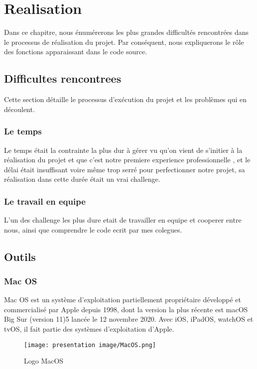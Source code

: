 \chapter{Realisation }
Dans ce chapitre, nous énumérerons les plus grandes difficultés rencontrées dans le processus de réalisation du projet. Par conséquent, nous expliquerons le rôle des fonctions apparaissant dans le code source.


\section{Difficultes rencontrees}


Cette section détaille le processus d'exécution du projet et les problèmes qui en découlent.
\subsection{Le temps}
Le temps était la contrainte la plus dur à gérer vu qu'on vient de s'initier à la réalisation du projet et que c'est notre premiere experience professionnelle , et le délai était insuffisant voire même trop serré pour perfectionner notre projet, sa réalisation dans cette durée était un vrai challenge.


\subsection{Le travail en equipe}
L'un des challenge les plus dure etait de travailler en equipe et cooperer entre nous, ainsi que comprendre le code ecrit par mes colegues.


\section{Outils}
\subsection{Mac OS}
Mac OS est un système d’exploitation partiellement propriétaire développé et commercialisé par Apple depuis 1998, dont la version la plus récente est macOS Big Sur (version 11)5 lancée le 12 novembre 2020. Avec iOS, iPadOS, watchOS et tvOS, il fait partie des systèmes d'exploitation d'Apple.
\begin{figure}[!h]
\begin{center}
\texttt{[image: presentation image/MacOS.png]}
\end{center}
\caption{Logo MacOS}
\end{figure}

